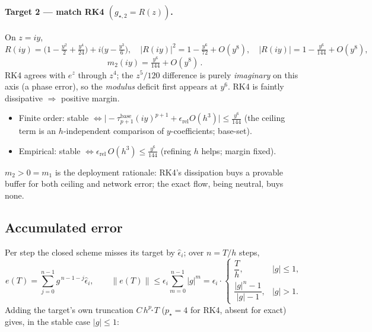\documentclass[11pt]{article}
\begin{document}
\paragraph{Target 2 --- match RK4 $(g_{\star,2}=R(z))$.}
On $z=iy$,
\begin{equation}
  R(iy)=\Big(1-\tfrac{y^2}{2}+\tfrac{y^4}{24}\Big)+i\Big(y-\tfrac{y^3}{6}\Big),
  \quad
  |R(iy)|^2=1-\tfrac{y^6}{72}+O(y^8),
  \quad
  |R(iy)|=1-\tfrac{y^6}{144}+O(y^8),
  \label{eq:Riy}
\end{equation}
\begin{equation}
  \boxed{\,m_2(iy)=\tfrac{y^6}{144}+O(y^8)\, }.
  \label{eq:m2}
\end{equation}
RK4 agrees with $e^z$ through $z^4$; the $z^5/120$ difference is purely
\emph{imaginary} on this axis (a phase error), so the \emph{modulus} deficit
first appears at $y^6$. RK4 is faintly dissipative $\Rightarrow$ positive margin.
\begin{itemize}\itemsep0pt
\item Finite order: stable $\iff
      \big|{-}\tau_{p+1}^{\mathrm{base}}(iy)^{p+1}+\epsilon_{\mathrm{rel}}O(h^3)\big|
      \le \tfrac{y^6}{144}$
      (the ceiling term is an $h$-independent comparison of $y$-coefficients; base-set).
\item Empirical: stable $\iff \epsilon_{\mathrm{rel}}\,O(h^3)\le\tfrac{y^6}{144}$
      (refining $h$ helps; margin fixed).
\end{itemize}

\begin{remark}
$m_2>0=m_1$ is the deployment rationale: RK4's dissipation buys a provable
buffer for both ceiling and network error; the exact flow, being neutral, buys
none.
\end{remark}

\subsection{Accumulated error}
\label{sec:stab-accum}

Per step the closed scheme misses its target by $\hat\epsilon_i$; over
$n=T/h$ steps,
\begin{equation}
  e(T)=\sum_{j=0}^{n-1} g^{\,n-1-j}\hat\epsilon_i,
  \qquad
  \|e(T)\|\le \epsilon_i\sum_{m=0}^{n-1}|g|^{m}
  =\epsilon_i\cdot
  \begin{cases}
    \dfrac{T}{h}, & |g|\le1,\\[1.2ex]
    \dfrac{|g|^{n}-1}{|g|-1}, & |g|>1.
  \end{cases}
  \label{eq:accum}
\end{equation}
Adding the target's own truncation $C\,h^{p_\star}T$ ($p_\star=4$ for RK4,
absent for exact) gives, in the stable case $|g|\le1$:
\end{document}
